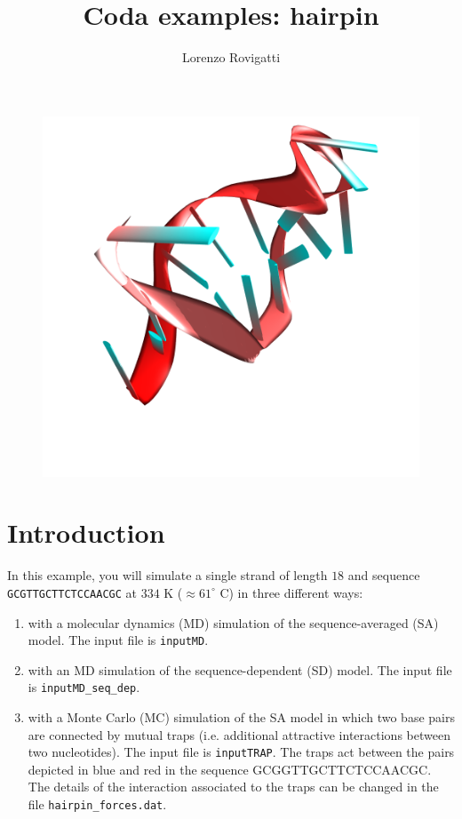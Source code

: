 \documentclass[superscriptaddress,prb]{revtex4-1}
\begin{document}
\title{\Huge{Coda examples: hairpin}}
\author{Lorenzo Rovigatti}

\begin{figure}[h!]
\centering
\includegraphics[width=15cm]{hairpin.png}
\label{fig:histo_MD_seq_dep}
\end{figure}

\maketitle

\section{Introduction}
\label{sec:introduction}

In this example, you will simulate a single strand of length $18$ and sequence {\tt GCGTTGCTTCTCCAACGC} at $334$ K ($\approx 61^\circ$ C) in three different ways:

\begin{enumerate}
\item with a molecular dynamics (MD) simulation of the sequence-averaged (SA) model. The input file is \texttt{inputMD}.
\item with an MD simulation of the sequence-dependent (SD) model. The input file is \texttt{inputMD\_seq\_dep}. 
\item with a Monte Carlo (MC) simulation of the SA model in which two base pairs are connected by mutual traps (i.e. additional attractive interactions between two nucleotides). The input file is \texttt{inputTRAP}.
The traps act between the pairs depicted in blue and red in the sequence G{\color{red}C}{\color{blue}G}GTTGCTTCTCCAA{\color{blue}C}{\color{red}G}C. The details of the interaction associated to the traps can be changed in the file \texttt{hairpin\_forces.dat}.
\end{enumerate}
\end{document}
